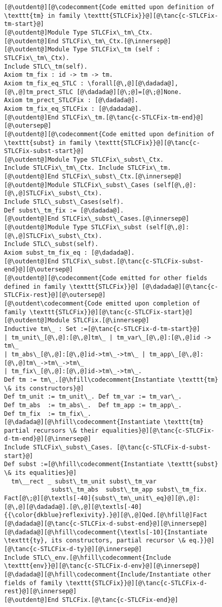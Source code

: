 \begin{figure}
\begin{minipage}{\textwidth}
\begin{multicols}{2}
\begin{lstlisting}
[@\outdent@][@\codecomment{Code emitted upon definition of \texttt{tm} in family \texttt{STLCFix}}@][@\tanc{c-STLCFix-tm-start}@]
[@\outdent@]Module Type STLCFix\_tm\_Ctx.
[@\outdent@]End STLCFix\_tm\_Ctx.[@\innersep@]
[@\outdent@]Module Type STLCFix\_tm (self : STLCFix\_tm\_Ctx).
Include STLC\_tm(self).
Axiom tm_fix : id -> tm -> tm.
Axiom tm_fix_eq_STLC : \forall[@\,@][@\dadada@],[@\,@]tm_prect_STLC [@\dadada@][@\;@]=[@\;@]None.
Axiom tm_prect_STLCFix : [@\dadada@].
Axiom tm_fix_eq_STLCFix : [@\dadada@].
[@\outdent@]End STLCFix\_tm.[@\tanc{c-STLCFix-tm-end}@][@\outersep@]
[@\outdent@][@\codecomment{Code emitted upon definition of \texttt{subst} in family \texttt{STLCFix}}@][@\tanc{c-STLCFix-subst-start}@]
[@\outdent@]Module Type STLCFix\_subst\_Ctx.
Include STLCFix\_tm\_Ctx. Include STLCFix\_tm.
[@\outdent@]End STLCFix\_subst\_Ctx.[@\innersep@]
[@\outdent@]Module STLCFix\_subst\_Cases (self[@\,@]:[@\,@]STLCFix\_subst\_Ctx).
Include STLC\_subst\_Cases(self).
Def subst\_tm_fix := [@\dadada@].
[@\outdent@]End STLCFix\_subst\_Cases.[@\innersep@]
[@\outdent@]Module Type STLCFix\_subst (self[@\,@]:[@\,@]STLCFix\_subst\_Ctx).
Include STLC\_subst(self).
Axiom subst_tm_fix_eq : [@\dadada@].
[@\outdent@]End STLCFix\_subst.[@\tanc{c-STLCFix-subst-end}@][@\outersep@]
[@\outdent@][@\codecomment{Code emitted for other fields defined in family \texttt{STLCFix}}@] [@\dadada@][@\tanc{c-STLCFix-rest}@][@\outersep@]
[@\outdent\codecomment{Code emitted upon completion of family \texttt{STLCFix}}@][@\tanc{c-STLCFix-start}@]
[@\outdent@]Module STLCFix.[@\innersep@]
Inductive tm\_ : Set :=[@\tanc{c-STLCFix-d-tm-start}@]
| tm_unit\_[@\,@]:[@\,@]tm\_ | tm_var\_[@\,@]:[@\,@]id -> tm\_
| tm_abs\_[@\,@]:[@\,@]id->tm\_->tm\_ | tm_app\_[@\,@]:[@\,@]tm\_->tm\_->tm\_
| tm_fix\_[@\,@]:[@\,@]id->tm\_->tm\_.
Def tm := tm\_.[@\hfill\codecomment{Instantiate \texttt{tm} \& its constructors}@]
Def tm_unit := tm_unit\_. Def tm_var := tm_var\_.
Def tm_abs  := tm_abs\_.  Def tm_app := tm_app\_.
Def tm_fix  := tm_fix\_.
[@\dadada@][@\hfill\codecomment{Instantiate \texttt{tm} partial recursors \& their equalities}@][@\tanc{c-STLCFix-d-tm-end}@][@\innersep@]
Include STLCFix\_subst\_Cases. [@\tanc{c-STLCFix-d-subst-start}@]
Def subst :=[@\hfill\codecomment{Instantiate \texttt{subst} \& its equalities}@]
  tm\__rect _ subst\_tm_unit subst\_tm_var
             subst\_tm_abs  subst\_tm_app subst\_tm_fix.
Fact[@\;@][@\textls[-40]{subst\_tm\_unit\_eq}@][@\,@]:[@\,@][@\dadada@].[@\,@][@\textls[-40]{{\color{dkblue}reflexivity}.}@][@\,@]Qed.[@\hfill@]Fact [@\dadada@][@\tanc{c-STLCFix-d-subst-end}@][@\innersep@]
[@\dadada@][@\hfill\codecomment{\textls[-10]{Instantiate \texttt{ty}, its constructors, partial recursor \& eq.}}@][@\tanc{c-STLCFix-d-ty}@][@\innersep@]
Include STLC\_env.[@\hfill\codecomment{Include \texttt{env}}@][@\tanc{c-STLCFix-d-env}@][@\innersep@]
[@\dadada@][@\hfill\codecomment{Include/Instantiate other fields of family \texttt{STLCFix}}@][@\tanc{c-STLCFix-d-rest}@][@\innersep@]
[@\outdent@]End STLCFix.[@\tanc{c-STLCFix-end}@]
\end{lstlisting}


\end{multicols}
\end{minipage}
\end{figure}
